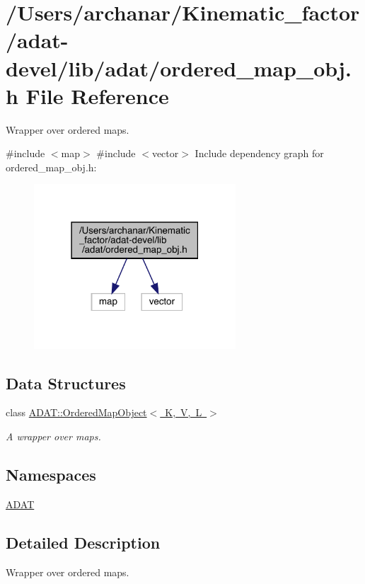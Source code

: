 \hypertarget{adat-devel_2lib_2adat_2ordered__map__obj_8h}{}\section{/\+Users/archanar/\+Kinematic\+\_\+factor/adat-\/devel/lib/adat/ordered\+\_\+map\+\_\+obj.h File Reference}
\label{adat-devel_2lib_2adat_2ordered__map__obj_8h}


Wrapper over ordered maps.  


{\ttfamily \#include $<$map$>$}\newline
{\ttfamily \#include $<$vector$>$}\newline
Include dependency graph for ordered\+\_\+map\+\_\+obj.\+h\+:
\nopagebreak
\begin{figure}[H]
\begin{center}
\leavevmode
\includegraphics[width=214pt]{d1/d1a/adat-devel_2lib_2adat_2ordered__map__obj_8h__incl}
\end{center}
\end{figure}
\subsection*{Data Structures}
\begin{DoxyCompactItemize}
\item 
class \mbox{\hyperlink{classADAT_1_1OrderedMapObject}{A\+D\+A\+T\+::\+Ordered\+Map\+Object$<$ K, V, L $>$}}
\begin{DoxyCompactList}\small\item\em A wrapper over maps. \end{DoxyCompactList}\end{DoxyCompactItemize}
\subsection*{Namespaces}
\begin{DoxyCompactItemize}
\item 
 \mbox{\hyperlink{namespaceADAT}{A\+D\+AT}}
\end{DoxyCompactItemize}


\subsection{Detailed Description}
Wrapper over ordered maps. 

